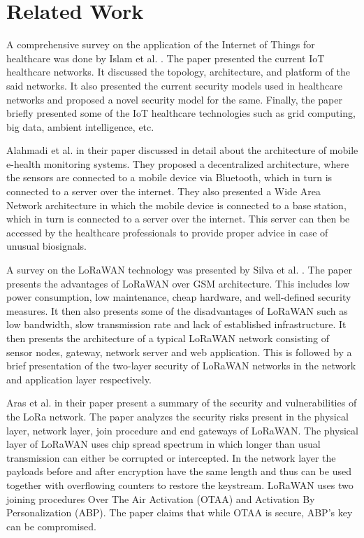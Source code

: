 \chapter{Related Work}
\label{cha:related-work}

A comprehensive survey on the application of the Internet of Things for healthcare was done by Islam et al. \cite{islam2015internet}. The paper presented the current IoT healthcare networks. It discussed the topology, architecture, and platform of the said networks. It also presented the current security models used in healthcare networks and proposed a novel security model for the same. Finally, the paper briefly presented some of the IoT healthcare technologies such as grid computing, big data, ambient intelligence, etc.

Alahmadi et al. \cite{alahmadi2011smart} in their paper discussed in detail about the architecture of mobile e-health monitoring systems. They proposed a decentralized architecture, where the sensors are connected to a mobile device via Bluetooth, which in turn is connected to a server over the internet. They also presented a Wide Area Network architecture in which the mobile device is connected to a base station, which in turn is connected to a server over the internet. This server can then be accessed by the healthcare professionals to provide proper advice in case of unusual biosignals.

A survey on the LoRaWAN technology was presented by Silva et al. \cite{de2017lorawan}. The paper presents the advantages of LoRaWAN over GSM architecture. This includes low power consumption, low maintenance, cheap hardware, and well-defined security measures. It then also presents some of the disadvantages of LoRaWAN such as low bandwidth, slow transmission rate and lack of established infrastructure. It then presents the architecture of a typical LoRaWAN network consisting of sensor nodes, gateway, network server and web application. 
This is followed by a brief presentation of the two-layer security of LoRaWAN networks in the network and application layer respectively.

Aras et al. \cite{aras2017exploring} in their paper present a summary of the security and vulnerabilities of the LoRa network. The paper analyzes the security risks present in the physical layer, network layer, join procedure and end gateways of LoRaWAN. The physical layer of LoRaWAN uses chip spread spectrum in which longer than usual transmission can either be corrupted or intercepted. In the network layer the payloads before and after encryption have the same length and thus can be used together with overflowing counters to restore the keystream. LoRaWAN uses two joining procedures Over The Air Activation (OTAA) and Activation By Personalization (ABP). The paper claims that while OTAA is secure, ABP's key can be compromised.

